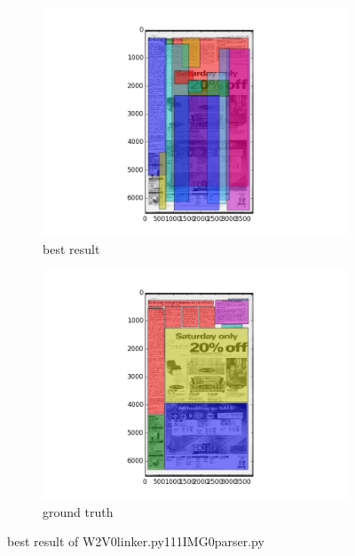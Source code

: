\documentclass[a4paper,10pt]{article}
\begin{document}
					\begin{figure}
					\centering
					\begin{subfigure}{.5\textwidth}
					  \centering
					  \includegraphics[width=10cm]
					{W2V0linker.py111IMG0parser.py.best.png}
					  \caption{best result}
					  \label{fig:sub1}
					\end{subfigure}%
					\begin{subfigure}{.5\textwidth}
					  \centering
					  \includegraphics[width=10cm]
					{W2V0linker.py111IMG0parser.py.gt.best.png}
					  \caption{ground truth}
					  \label{fig:sub2}
					\end{subfigure}
					\caption
					{best result of W2V0linker.py111IMG0parser.py}
					\label{fig:test}
					\end{figure}
					
\end{document}
